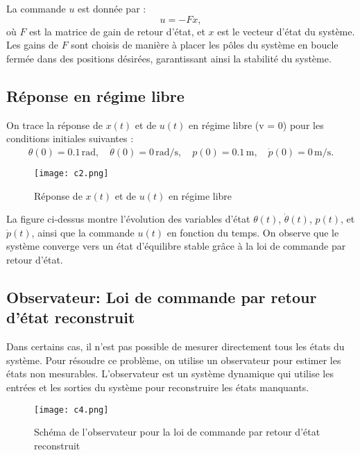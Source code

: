 \documentclass{report}
\begin{document}
La commande \( u \) est donnée par :
\[
u = -F x,
\]
où \( F \) est la matrice de gain de retour d'état, et \( x \) est le vecteur d'état du système. Les gains de \( F \) sont choisis de manière à placer les pôles du système en boucle fermée dans des positions désirées, garantissant ainsi la stabilité du système.

\subsection{Réponse en régime libre}

On trace la réponse de \( x(t) \) et de \( u(t) \) en régime libre (v = 0) pour les conditions initiales suivantes :
\[
\theta(0) = 0.1 \, \text{rad}, \quad \dot{\theta}(0) = 0 \, \text{rad/s}, \quad p(0) = 0.1 \, \text{m}, \quad \dot{p}(0) = 0 \, \text{m/s}.
\]

\begin{figure}[h!]
    \centering
    \texttt{[image: c2.png]} %
    \caption{Réponse de \( x(t) \) et de \( u(t) \) en régime libre}
    \label{fig:c2}
\end{figure}

La figure ci-dessus montre l'évolution des variables d'état \( \theta(t) \), \( \dot{\theta}(t) \), \( p(t) \), et \( \dot{p}(t) \), ainsi que la commande \( u(t) \) en fonction du temps. On observe que le système converge vers un état d'équilibre stable grâce à la loi de commande par retour d'état.

\subsection{Observateur: Loi de commande par retour d’état reconstruit}

Dans certains cas, il n'est pas possible de mesurer directement tous les états du système. Pour résoudre ce problème, on utilise un observateur pour estimer les états non mesurables. L'observateur est un système dynamique qui utilise les entrées et les sorties du système pour reconstruire les états manquants.

\begin{figure}[h!]
    \centering
    \texttt{[image: c4.png]} %
    \caption{Schéma de l'observateur pour la loi de commande par retour d'état reconstruit}
    \label{fig:c4}
\end{figure}
\end{document}
